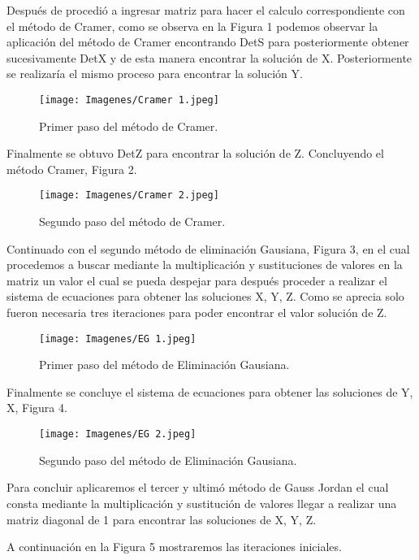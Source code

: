 \documentclass[fleqn,10pt]{olplainarticle}
\begin{document}
Después de procedió a ingresar matriz para hacer el calculo correspondiente con el método de Cramer, como se observa en la Figura 1 podemos observar la aplicación del método de Cramer encontrando DetS para posteriormente obtener sucesivamente DetX y de esta manera encontrar la solución de X.
Posteriormente se realizaría el mismo proceso para encontrar la solución Y.

\begin{figure}[ht!]
\centering
\texttt{[image: Imagenes/Cramer 1.jpeg]}
\caption{Primer paso del método de Cramer.}
\end{figure}

Finalmente se obtuvo DetZ para encontrar la solución de Z.
Concluyendo el método Cramer, Figura 2.

\begin{figure}[h!]
\centering
\texttt{[image: Imagenes/Cramer 2.jpeg]}
\caption{Segundo paso del método de Cramer.}
\end{figure}

Continuado con el segundo método de eliminación Gausiana, Figura 3, en el cual procedemos a buscar mediante la multiplicación y sustituciones de valores en la matriz un valor el cual se pueda despejar para después proceder a realizar el sistema de ecuaciones para obtener las soluciones X, Y, Z.
Como se aprecia solo fueron necesaria tres iteraciones para poder encontrar el valor solución de Z.
\\
\smallskip

\begin{figure}[ht!]
\centering
\texttt{[image: Imagenes/EG 1.jpeg]}
\caption{Primer paso del método de Eliminación Gausiana.}
\end{figure}

Finalmente se concluye el sistema de ecuaciones para obtener las soluciones de Y, X, Figura 4. 
\smallskip

\begin{figure}[h!]
\centering
\texttt{[image: Imagenes/EG 2.jpeg]}
\caption{Segundo paso del método de Eliminación Gausiana.}
\end{figure}

Para concluir aplicaremos el tercer y ultimó método de Gauss Jordan el cual consta mediante la multiplicación y sustitución de valores llegar a realizar una matriz diagonal de 1 para encontrar las soluciones de X, Y, Z. 
\smallskip

A continuación en la Figura 5 mostraremos las iteraciones iniciales.
\\
\bigskip\bigskip\bigskip\bigskip\bigskip\bigskip\bigskip\bigskip
\bigskip\bigskip\bigskip\bigskip\bigskip\bigskip\bigskip\bigskip\bigskip
\end{document}
